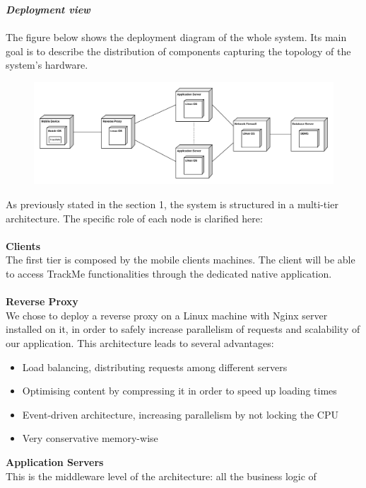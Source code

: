 \begin{legal}
		\item \textit{\textbf{Deployment view}}\\\\
		The figure below shows the deployment diagram of the whole system. Its main goal is to describe the distribution of components capturing the topology of the
system's hardware.\\
		\begin{figure}[H]
		\includegraphics[width=\linewidth]{../images/design/DeploymentDiagram.png}\\
		\end{figure}
		As previously stated in the section 1, the system is structured in a multi-tier architecture. The specific role of each node is clarified here:\\\\
		\textbf{Clients}\\
The first tier is composed by the mobile clients machines. The client will be able to access TrackMe functionalities through the dedicated native application.\\\\
		\textbf{Reverse Proxy}\\
We chose to deploy a reverse proxy on a Linux machine with Nginx server installed on it, in order to safely increase parallelism of requests and scalability
of our application. This architecture leads to several advantages:
		\begin{itemize}
			\item Load balancing, distributing requests among different servers
			\item Optimising content by compressing it in order to speed up loading times
			\item Event-driven architecture, increasing parallelism by not locking the CPU
			\item Very conservative memory-wise\\
		\end{itemize}
		\textbf{Application Servers}\\
This is the middleware level of the architecture: all the business logic of

\end{legal}
